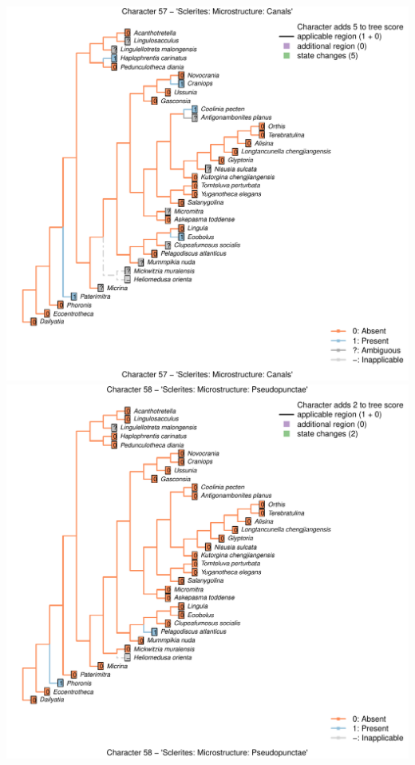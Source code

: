 \documentclass[]{book}
\theoremstyle{definition}
\theoremstyle{definition}
\theoremstyle{definition}
\theoremstyle{remark}
\begin{document}
\includegraphics{Brachiopod_phylogeny_files/figure-latex/unnamed-chunk-4-57.pdf}
\includegraphics{Brachiopod_phylogeny_files/figure-latex/unnamed-chunk-4-58.pdf}
\end{document}
